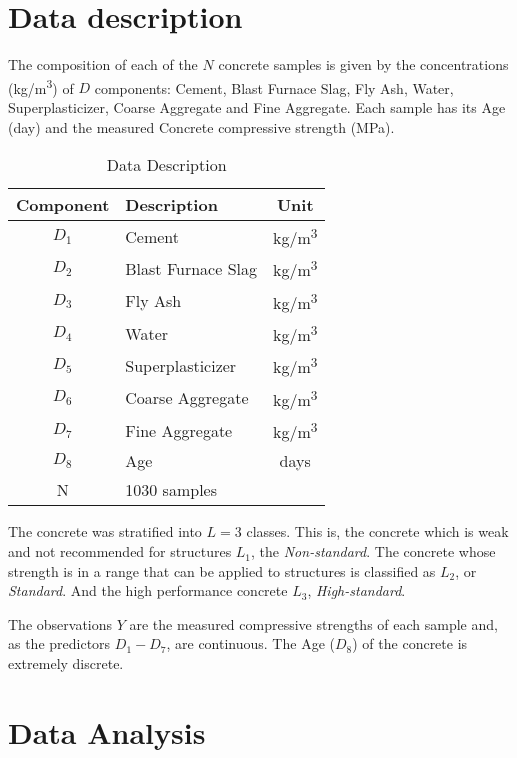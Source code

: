\documentclass[conference]{IEEEtran}
\begin{document}
\section{Data description}

The composition of each of the $N$ concrete samples is given by the concentrations (kg/m\textsuperscript{3}) of $D$ components: Cement, Blast Furnace Slag, Fly Ash, Water, Superplasticizer, Coarse Aggregate and Fine Aggregate. Each sample has its Age (day) and the measured Concrete compressive strength (MPa).

\begin{table}[htp]
\caption{Data Description}
\begin{center}
  \begin{tabular}{@{} clc @{}}
    \toprule
    Component & Description & Unit \\ 
    \midrule
    $D_1$ & Cement & kg/m\textsuperscript{3} \\ 
    $D_2$ & Blast Furnace Slag & kg/m\textsuperscript{3} \\ 
    $D_3$ & Fly Ash & kg/m\textsuperscript{3} \\ 
    $D_4$ & Water & kg/m\textsuperscript{3} \\ 
    $D_5$ & Superplasticizer & kg/m\textsuperscript{3} \\ 
    $D_6$ & Coarse Aggregate & kg/m\textsuperscript{3} \\ 
    $D_7$ & Fine Aggregate & kg/m\textsuperscript{3} \\ 
    $D_8$ & Age & days \\ 
	\midrule
    N & 1030 samples&  \\ 
    \bottomrule
  \end{tabular}
\end{center}
\label{Data Description}
\end{table}%

The concrete was stratified into $L=3$ classes\cite{b1}. This is, the concrete which is weak and not recommended for structures $L_1$, the \emph{Non-standard}. The concrete whose strength is in a range that can be applied to structures is classified as $L_2$, or \emph{Standard}. And the high performance concrete $L_3$, \emph{High-standard}.

The observations $Y$ are the measured compressive strengths of each sample and, as the predictors $D_1 - D_7$, are continuous. The Age ($D_8$) of the concrete is extremely discrete.

\section{Data Analysis}
\end{document}
